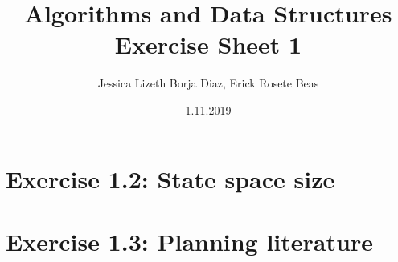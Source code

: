 \documentclass[10pt,a4paper]{article}
\title{\textbf{Algorithms and Data Structures
\\{\Large Exercise Sheet 1}}}
\author{Jessica Lizeth Borja Diaz, Erick Rosete Beas}
\date{1.11.2019}
\begin{document}
\maketitle


\section*{Exercise 1.2: State space size}
\section*{Exercise 1.3: Planning literature}
\end{document}
